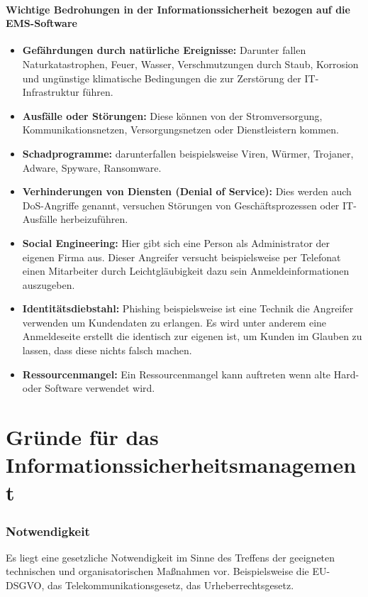 \paragraph{Wichtige Bedrohungen in der Informationssicherheit bezogen auf die EMS-Software}
\begin{itemize}
	\item \textbf{Gefährdungen durch natürliche Ereignisse:} Darunter fallen Naturkatastrophen, Feuer, Wasser, Verschmutzungen durch Staub, Korrosion und ungünstige klimatische Bedingungen die zur Zerstörung der IT-Infrastruktur führen.
	\item \textbf{Ausfälle oder Störungen:} Diese können von der Stromversorgung, Kommunikationsnetzen, Versorgungsnetzen oder Dienstleistern kommen.
	\item \textbf{Schadprogramme:} darunterfallen beispielsweise Viren, Würmer, Trojaner, Adware, Spyware, Ransomware.
	\item \textbf{Verhinderungen von Diensten (Denial of Service):} Dies werden auch DoS-Angriffe genannt, versuchen Störungen von Geschäftsprozessen oder IT-Ausfälle herbeizuführen.
	\item \textbf{Social Engineering:} Hier gibt sich eine Person als Administrator der eigenen Firma aus. Dieser Angreifer versucht beispielsweise per Telefonat einen Mitarbeiter durch Leichtgläubigkeit dazu  sein Anmeldeinformationen auszugeben.
	\item \textbf{Identitätsdiebstahl:} Phishing beispielsweise ist eine Technik die Angreifer verwenden um Kundendaten zu erlangen. Es wird unter anderem eine Anmeldeseite erstellt die identisch zur eigenen ist, um Kunden im Glauben zu lassen, dass diese nichts falsch machen.
	\item \textbf{Ressourcenmangel:} Ein Ressourcenmangel kann auftreten wenn alte Hard- oder Software verwendet wird. 
\end{itemize}

\section{Gründe für das Informationssicherheitsmanagement}
\subsubsection{Notwendigkeit}
Es liegt eine gesetzliche Notwendigkeit im Sinne des Treffens der geeigneten technischen und organisatorischen Maßnahmen vor. Beispielsweise die EU-DSGVO, das Telekommunikationsgesetz, das Urheberrechtsgesetz.

